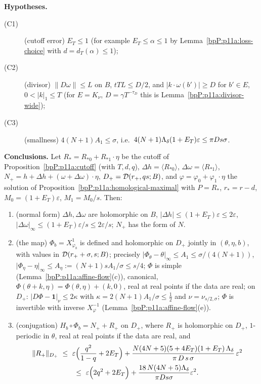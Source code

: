 \begin{proposition}
\textbf{Hypotheses.}
\begin{description}
\item[(C1)] (cutoff error) $E_T\le1$ (for example $E_T\le\alpha\le1$ by Lemma~\ref{bpP:p11a:loss-choice} with $d=d_T(\alpha)\le1$);
\item[(C2)] (divisor) $\lVert D\omega\rVert\le L$ on $B$, $tTL\le D/2$, and $\lvert k\cdot\omega(b')\rvert\ge D$ for $b'\in E$, $0<\lvert k\rvert_1\le T$ (for $E=K_\nu$, $D=\gamma T^{-\tau_D}$ this is Lemma~\ref{bpP:p11a:divisor-wide});
\item[(C3)] (smallness) $4(N+1)A_1\le\sigma$, i.e.\ $4(N+1)\Lambda_{\delta}(1+E_T)\varepsilon\le\pi Ds\sigma$.
\end{description}
\textbf{Conclusions.} Let $R_*=R_{*0}+R_{*1}\cdot\eta$ be the cutoff of Proposition~\ref{bpP:p11a:cutoff} (with $T,d,q$), $\Delta h=\langle R_{*0}\rangle$, $\Delta\omega=\langle R_{*1}\rangle$, $N_+=h+\Delta h+(\omega+\Delta\omega)\cdot\eta$, $D_+=\mathcal D(r_+,qs;B)$, and $\varphi=\varphi_0+\varphi_1\cdot\eta$ the solution of Proposition~\ref{bpP:p11a:homological-maximal} with $P=R_*$, $r_*=r-d$, $M_0=(1+E_T)\varepsilon$, $M_1=M_0/s$. Then:
\begin{enumerate}[label=(\roman*)]
\item (normal form) $\Delta h,\Delta\omega$ are holomorphic on $B$, $\lvert\Delta h\rvert\le(1+E_T)\varepsilon\le2\varepsilon$, $\lvert\Delta\omega\rvert_\infty\le(1+E_T)\varepsilon/s\le2\varepsilon/s$; $N_+$ has the form of $N$.
\item (the map) $\Phi_b=X^1_{\varphi_b}$ is defined and holomorphic on $D_+$ jointly in $(\theta,\eta,b)$, with values in $\mathcal D(r_++\sigma,s;B)$; precisely $\lvert\Phi_\theta-\theta\rvert_\infty\le A_1\le\sigma/(4(N+1))$, $\lvert\Phi_\eta-\eta\rvert_\infty\le A_\eta:=(N+1)sA_1/\sigma\le s/4$; $\Phi$ is simple (Lemma~\ref{bpP:p11a:affine-flow}(c)), canonical, $\Phi(\theta+k,\eta)=\Phi(\theta,\eta)+(k,0)$, real at real points if the data are real; on $D_+$: $\lvert D\Phi-\mathbf 1\rvert_\nu\le2\kappa$ with $\kappa=2(N+1)A_1/\sigma\le\frac12$ and $\nu=\nu_{s/2,\sigma}$; $\Phi$ is invertible with inverse $X^{-1}_\varphi$ (Lemma~\ref{bpP:p11a:affine-flow}(e)).
\item (conjugation) $H_b\circ\Phi_b=N_++R_+$ on $D_+$, where $R_+$ is holomorphic on $D_+$, $1$-periodic in $\theta$, real at real points if the data are real, and
\begin{multline*}\nrm{R_+}{D_+}\ \le\ \varepsilon\Bigl(\frac{q^2}{1-q}+2E_T\Bigr)+\frac{N(4N+5)(5+4E_T)(1+E_T)\,\Lam\delta}{\pi\,D\,s\,\sigma}\,\varepsilon^2\\ \le\ \varepsilon\Bigl(2q^2+2E_T\Bigr)+\frac{18\,N(4N+5)\Lam\delta}{\pi Ds\sigma}\varepsilon^2 .\end{multline*}

\end{enumerate}
\end{proposition}
